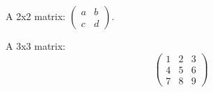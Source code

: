 A 2x2 matrix: $\begin{pmatrix} a & b \\ c & d \end{pmatrix}$.

A 3x3 matrix:
\[
\begin{pmatrix}
1 & 2 & 3 \\
4 & 5 & 6 \\
7 & 8 & 9
\end{pmatrix}
\]
